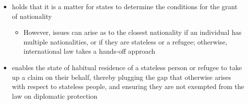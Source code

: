 \begin{itemize}
    \item {} holds that it is a matter for states to determine the conditions for the grant of nationality
    \begin{itemize}
        \item However, issues can arise as to the closest nationality if an individual has multiple nationalities, or if they are stateless or a refugee; otherwise, international law takes a hands-off approach
    \end{itemize}
    \item {} enables the state of habitual residence of a stateless person or refugee to take up a claim on their behalf, thereby plugging the gap that otherwise arises with respect to stateless people, and ensuring they are not exempted from the law on diplomatic protection
\end{itemize}


